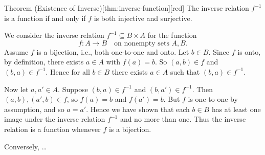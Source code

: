 \begin{define}{Theorem (Existence of Inverse)}[thm:inverse-function][red]
  The inverse relation $f^{-1}$ is a function if and only if $f$ is both injective and surjective.
  \begin{subprove}
    We consider the inverse relation $f^{-1} \subseteq B \times A$ for the function 
    \[
    f : A \to B \quad \text{on nonempty sets $A,B$.}
    \]
    Assume $f$ is a bijection, i.e., both one-to-one and onto. Let $b \in B$. Since $f$ is onto, by definition, there exists $a \in A$ with $f(a) = b$. So $(a,b) \in f$ and $(b,a) \in f^{-1}$. Hence for all $b \in B$ there exists $a \in A$ such that $(b,a) \in f^{-1}$. 

    Now let $a, a' \in A$. Suppose $(b,a) \in f^{-1}$ and $(b,a') \in f^{-1}$. 
    Then $(a,b), (a',b) \in f$, so $f(a) = b$ and $f(a') = b$. 
    But $f$ is one-to-one by assumption, and so $a = a'$. 
    Hence we have shown that each $b \in B$ has at least one image under 
    the inverse relation $f^{-1}$ and no more than one. 
    Thus the inverse relation is a function whenever $f$ is a bijection.

    \medskip
    Conversely, \dots
  \end{subprove}
    
    

\end{define}






\newpage













